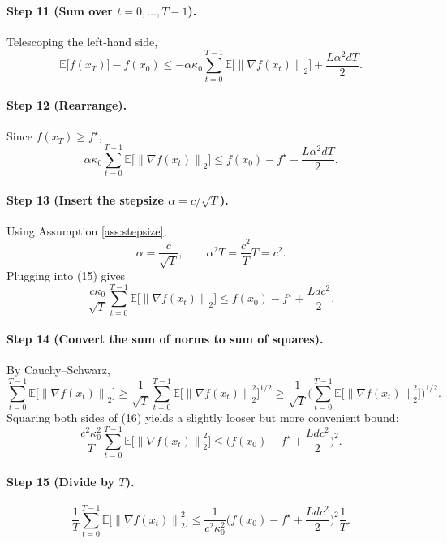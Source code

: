 \documentclass[11pt]{article}
\newcommand{\EE}{\mathbb{E}}
\newcommand{\norm}[1]{\left\lVert#1\right\rVert}
\begin{document}
\paragraph{Step 11 (Sum over $t=0,\dots,T-1$).}
Telescoping the left‑hand side,
\[
\EE\big[f(x_{T})\big]-f(x_{0})
\le -\alpha\kappa_{0}\sum_{t=0}^{T-1}\EE\!\big[\norm{\nabla f(x_{t})}_{2}\big]
    +\frac{L\alpha^{2}d T}{2}.
\tag{14}
\]

\paragraph{Step 12 (Rearrange).}
Since $f(x_{T})\ge f^{\star}$,
\[
\alpha\kappa_{0}\sum_{t=0}^{T-1}\EE\!\big[\norm{\nabla f(x_{t})}_{2}\big]
\le f(x_{0})-f^{\star}
    +\frac{L\alpha^{2}d T}{2}.
\tag{15}
\]

\paragraph{Step 13 (Insert the stepsize $\alpha=c/\sqrt{T}$).}
Using Assumption \ref{ass:stepsize},
\[
\alpha = \frac{c}{\sqrt{T}},\qquad 
\alpha^{2}T = \frac{c^{2}}{T}T = c^{2}.
\]
Plugging into (15) gives
\[
\frac{c\kappa_{0}}{\sqrt{T}}\sum_{t=0}^{T-1}\EE\!\big[\norm{\nabla f(x_{t})}_{2}\big]
\le f(x_{0})-f^{\star}
    +\frac{L d c^{2}}{2}.
\tag{16}
\]

\paragraph{Step 14 (Convert the sum of norms to sum of squares).}
By Cauchy–Schwarz,
\[
\sum_{t=0}^{T-1}\EE\!\big[\norm{\nabla f(x_{t})}_{2}\big]
\ge \frac{1}{\sqrt{T}}\sum_{t=0}^{T-1}\EE\!\big[\norm{\nabla f(x_{t})}_{2}^{2}\big]^{1/2}
\ge \frac{1}{\sqrt{T}}\Big(\sum_{t=0}^{T-1}\EE\!\big[\norm{\nabla f(x_{t})}_{2}^{2}\big]\Big)^{1/2}.
\]
Squaring both sides of (16) yields a slightly looser but more convenient bound:
\[
\frac{c^{2}\kappa_{0}^{2}}{T}\sum_{t=0}^{T-1}\EE\!\big[\norm{\nabla f(x_{t})}_{2}^{2}\big]
\le \Big(f(x_{0})-f^{\star}+\frac{L d c^{2}}{2}\Big)^{2}.
\tag{17}
\]

\paragraph{Step 15 (Divide by $T$).}
\[
\frac{1}{T}\sum_{t=0}^{T-1}\EE\!\big[\norm{\nabla f(x_{t})}_{2}^{2}\big]
\le
\frac{1}{c^{2}\kappa_{0}^{2}}
\Big(f(x_{0})-f^{\star}+\frac{L d c^{2}}{2}\Big)^{2}
\frac{1}{T}.
\tag{18}
\]
\end{document}
